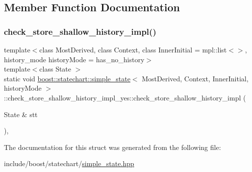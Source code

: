 \subsection{Member Function Documentation}
\mbox{\label{structboost_1_1statechart_1_1simple__state_1_1check__store__shallow__history__impl__yes_a8e25e5708de1577ac66e2dd73851de46}} 
\subsubsection{\texorpdfstring{check\+\_\+store\+\_\+shallow\+\_\+history\+\_\+impl()}{check\_store\_shallow\_history\_impl()}}
{\footnotesize\ttfamily template$<$class Most\+Derived, class Context, class Inner\+Initial = mpl\+::list$<$$>$, history\+\_\+mode history\+Mode = has\+\_\+no\+\_\+history$>$ \\
template$<$class State $>$ \\
static void \mbox{\hyperlink{classboost_1_1statechart_1_1simple__state}{boost\+::statechart\+::simple\+\_\+state}}$<$ Most\+Derived, Context, Inner\+Initial, history\+Mode $>$\+::check\+\_\+store\+\_\+shallow\+\_\+history\+\_\+impl\+\_\+yes\+::check\+\_\+store\+\_\+shallow\+\_\+history\+\_\+impl (\begin{DoxyParamCaption}\item[{State \&}]{stt }\end{DoxyParamCaption})\hspace{0.3cm}{\ttfamily [inline]}, {\ttfamily [static]}}



The documentation for this struct was generated from the following file\+:\begin{DoxyCompactItemize}
\item 
include/boost/statechart/\mbox{\hyperlink{simple__state_8hpp}{simple\+\_\+state.\+hpp}}\end{DoxyCompactItemize}
